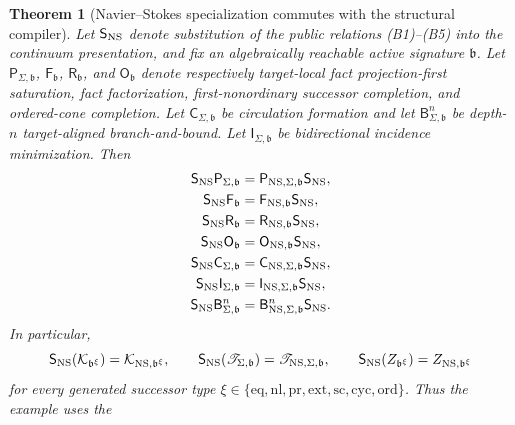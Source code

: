 \documentclass[11pt]{article}
\numberwithin{section}{part}
\theoremstyle{plain}
\newtheorem{theorem}{Theorem}[section]
\theoremstyle{definition}
\theoremstyle{remark}
\newcommand{\Spine}{\mathscr T}
\begin{document}
\begin{theorem}[Navier--Stokes specialization commutes with the structural
compiler]
\label{thm:ns-specialization-commutes}
Let \(\mathsf S_{\rm NS}\) denote substitution of the public relations
\textup{(B1)}--\textup{(B5)} into the continuum presentation, and fix an
algebraically reachable active signature \(\mathfrak b\).  Let
\(\mathsf P_{\Sigma,\mathfrak b}\),
\(\mathsf F_{\mathfrak b}\), \(\mathsf R_{\mathfrak b}\), and
\(\mathsf O_{\mathfrak b}\) denote respectively target-local fact
projection-first saturation, fact factorization, first-nonordinary successor
completion, and ordered-cone completion.  Let
\(\mathsf C_{\Sigma,\mathfrak b}\) be circulation formation and let
\(\mathsf B^n_{\Sigma,\mathfrak b}\) be depth-
\(n\) target-aligned branch-and-bound.  Let
\(\mathsf I_{\Sigma,\mathfrak b}\) be bidirectional incidence minimization.
Then
\begin{align}
 \mathsf S_{\rm NS}\mathsf P_{\Sigma,\mathfrak b}
 &=\mathsf P_{{\rm NS},\Sigma,\mathfrak b}\mathsf S_{\rm NS},
 \label{eq:ns-commutes-projection}\\
 \mathsf S_{\rm NS}\mathsf F_{\mathfrak b}
 &=\mathsf F_{{\rm NS},\mathfrak b}\mathsf S_{\rm NS},
 \label{eq:ns-commutes-fact}\\
 \mathsf S_{\rm NS}\mathsf R_{\mathfrak b}
 &=\mathsf R_{{\rm NS},\mathfrak b}\mathsf S_{\rm NS},
 \label{eq:ns-commutes-successor}\\
 \mathsf S_{\rm NS}\mathsf O_{\mathfrak b}
 &=\mathsf O_{{\rm NS},\mathfrak b}\mathsf S_{\rm NS},
 \label{eq:ns-commutes-cone}\\
 \mathsf S_{\rm NS}\mathsf C_{\Sigma,\mathfrak b}
 &=\mathsf C_{{\rm NS},\Sigma,\mathfrak b}\mathsf S_{\rm NS},
 \label{eq:ns-commutes-circulation}\\
 \mathsf S_{\rm NS}\mathsf I_{\Sigma,\mathfrak b}
 &=\mathsf I_{{\rm NS},\Sigma,\mathfrak b}\mathsf S_{\rm NS},
 \label{eq:ns-commutes-incidence}\\
 \mathsf S_{\rm NS}\mathsf B^n_{\Sigma,\mathfrak b}
 &=\mathsf B^n_{{\rm NS},\Sigma,\mathfrak b}\mathsf S_{\rm NS}.
 \label{eq:ns-commutes-branch-bound}
\end{align}
In particular,
\[
 \mathsf S_{\rm NS}(\mathcal K_{\mathfrak b^\xi})
 =\mathcal K_{{\rm NS},\mathfrak b^\xi},
 \qquad
 \mathsf S_{\rm NS}(\Spine_{\Sigma,\mathfrak b})
 =\Spine_{{\rm NS},\Sigma,\mathfrak b},
 \qquad
 \mathsf S_{\rm NS}(Z_{\mathfrak b^\xi})
 =Z_{{\rm NS},\mathfrak b^\xi}
\]
for every generated successor type
\(\xi\in\{\mathrm{eq,nl,pr,ext,sc,cyc,ord}\}\).  Thus the example uses the

\end{theorem}
\end{document}
